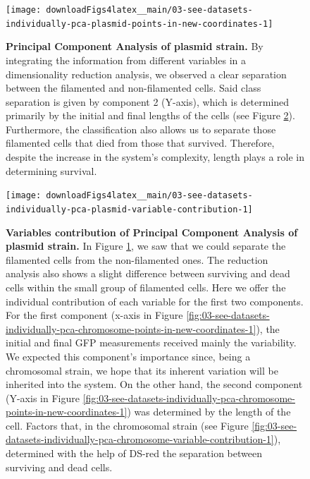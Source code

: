 \documentclass[a4paper, nobind]{templates/ociamthesis}
\begin{document}
\begin{figure}[H]
\texttt{[image: downloadFigs4latex\_\_main/03-see-datasets-individually-pca-plasmid-points-in-new-coordinates-1]} \caption[Principal Component Analysis of plasmid strain.]{\textbf{Principal Component Analysis of plasmid strain.} By integrating the information from different variables in a dimensionality reduction analysis, we observed a clear separation between the filamented and non-filamented cells. Said class separation is given by component 2 (Y-axis), which is determined primarily by the initial and final lengths of the cells (see Figure \ref{fig:03-see-datasets-individually-pca-plasmid-variable-contribution-1}). Furthermore, the classification also allows us to separate those filamented cells that died from those that survived. Therefore, despite the increase in the system's complexity, length plays a role in determining survival.}\label{fig:03-see-datasets-individually-pca-plasmid-points-in-new-coordinates-1}
\end{figure}





\begin{figure}[H]
\texttt{[image: downloadFigs4latex\_\_main/03-see-datasets-individually-pca-plasmid-variable-contribution-1]} \caption[Variables contribution of Principal Component Analysis of plasmid strain.]{\textbf{Variables contribution of Principal Component Analysis of plasmid strain.} In Figure \ref{fig:03-see-datasets-individually-pca-plasmid-points-in-new-coordinates-1}, we saw that we could separate the filamented cells from the non-filamented ones. The reduction analysis also shows a slight difference between surviving and dead cells within the small group of filamented cells. Here we offer the individual contribution of each variable for the first two components. For the first component (x-axis in Figure \ref{fig:03-see-datasets-individually-pca-chromosome-points-in-new-coordinates-1}), the initial and final GFP measurements received mainly the variability. We expected this component's importance since, being a chromosomal strain, we hope that its inherent variation will be inherited into the system. On the other hand, the second component (Y-axis in Figure \ref{fig:03-see-datasets-individually-pca-chromosome-points-in-new-coordinates-1}) was determined by the length of the cell. Factors that, in the chromosomal strain (see Figure \ref{fig:03-see-datasets-individually-pca-chromosome-variable-contribution-1}), determined with the help of DS-red the separation between surviving and dead cells.}\label{fig:03-see-datasets-individually-pca-plasmid-variable-contribution-1}
\end{figure}
\end{document}
